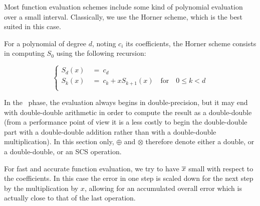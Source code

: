 Most function evaluation schemes include some kind of polynomial
evaluation over a small interval. Classically, we use the Horner
scheme, which is the best suited in this case. 

For a polynomial of degree $d$, noting $c_i$ its coefficients, the
Horner scheme consists in computing $S_0$ using the following
recursion:

  $$ \left\{
    \begin{array}{rl}
      S_d(x)  &\ = \ c_d\\
      S_k(x)  &\  =\ c_k+xS_{k+1}(x) \quad \mathrm{for}\quad 0\le k <d\\
    \end{array}
  \right.
  $$


  
  In the \quick\ phase, the evaluation always begins in
  double-precision, but it may end with double-double arithmetic in
  order to compute the result as a double-double (from a performance
  point of view it is a less costly to begin the double-double part
  with a double-double addition rather than with a double-double
  multiplication).  In this section only, $\oplus$ and $\otimes$
  therefore denote either a double, or a double-double, or an SCS
  operation.


  For fast and accurate function evaluation, we try to have ${\overline{x}}$
  small with respect to the coefficients.  In this case the error in
  one step is scaled down for the next step by the multiplication by
  $x$, allowing for an accumulated overall error which is actually
  close to that of the last operation. 

  
  

